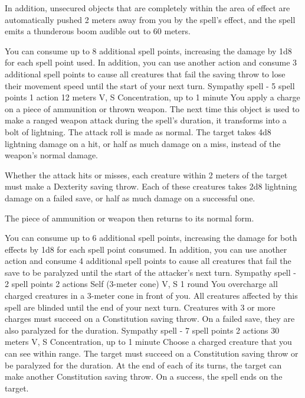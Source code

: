         In addition, unsecured objects that are completely within the area of effect are automatically pushed 2 meters away from you by the spell's effect, and the spell emits a thunderous boom audible out to 60 meters.

        You can consume up to 8 additional spell points, increasing the damage by 1d8 for each spell point used.
        In addition, you can use another action and consume 3 additional spell points to cause all creatures that fail the saving throw to lose their movement speed until the start of your next turn.
        {Sympathy spell - 5 spell points}
        {1 action}
        {12 meters}
        {V, S}
        {Concentration, up to 1 minute}
        You apply a charge on a piece of ammunition or thrown weapon.
        The next time this object is used to make a ranged weapon attack during the spell's duration, it transforms into a bolt of lightning.
        The attack roll is made as normal.
        The target takes 4d8 lightning damage on a hit, or half as much damage on a miss, instead of the weapon's normal damage.

        Whether the attack hits or misses, each creature within 2 meters of the target must make a Dexterity saving throw.
        Each of these creatures takes 2d8 lightning damage on a failed save, or half as much damage on a successful one.

        The piece of ammunition or weapon then returns to its normal form.

        You can consume up to 6 additional spell points, increasing the damage for both effects by 1d8 for each spell point consumed.
        In addition, you can use another action and consume 4 additional spell points to cause all creatures that fail the save to be paralyzed until the start of the attacker's next turn.
        {Sympathy spell - 2 spell points}
        {2 actions}
        {Self (3-meter cone)}
        {V, S}
        {1 round}
        You overcharge all charged creatures in a 3-meter cone in front of you.
        All creatures affected by this spell are blinded until the end of your next turn.
        Creatures with 3 or more charges must succeed on a Constitution saving throw.
        On a failed save, they are also paralyzed for the duration.
        {Sympathy spell - 7 spell points}
        {2 actions}
        {30 meters}
        {V, S}
        {Concentration, up to 1 minute}
        Choose a charged creature that you can see within range.
        The target must succeed on a Constitution saving throw or be paralyzed for the duration.
        At the end of each of its turns, the target can make another Constitution saving throw.
        On a success, the spell ends on the target.

